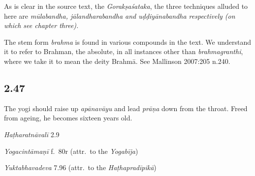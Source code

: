 \begin{ekdosis}
\begin{philcomm}[hp02_046]
As is clear in the source text, the \emph{Gorakṣaśataka}, the three techniques alluded to here are \sl{mūlabandha, jālandharabandha} and \emph{uḍḍiyānabandha} respectively (on which see chapter three).

The stem form \emph{brahma} is found in various compounds in the text. We understand it to refer to Brahman, the absolute, in all instances other than \emph{brahmagranthi}, where we take it to mean the deity Brahmā. See Mallinson 2007:205 n.240.
\end{philcomm}

\subsection*{2.47}
\begin{translation}[hp02_047]
The yogi should raise up \emph{apānavāyu} and lead \emph{prāṇa} down from the throat. Freed from ageing, he becomes sixteen years old.
\end{translation}


\begin{testimonia}[hp02_047]
\emph{Haṭharatnāvalī} 2.9
\begin{versinnote}
\end{versinnote} 

\emph{Yogacintāmaṇī} f.~80r (attr.~to the \emph{Yogabīja})

\begin{versinnote}
\end{versinnote}

\emph{Yuktabhavadeva} 7.96 (attr.~to the \emph{Haṭhapradīpikā})

\begin{versinnote}
\end{versinnote}
\end{testimonia}


\end{ekdosis}

